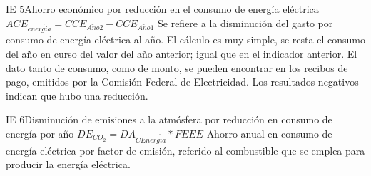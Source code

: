 \begin{indicador}{IE 5}{Ahorro económico por reducción en el consumo de energía eléctrica}
	{$ACE_{energ\acute{i}a} = CCE_{A\tilde{n}o 2} - CCE_{A\tilde{n}o 1}$}
	{
		Se refiere a la disminución del gasto por consumo de energía eléctrica al año. El cálculo es muy simple, se resta el consumo del año en curso del valor del año anterior; 
		igual que en el indicador anterior. El dato tanto de consumo, como de monto, se pueden encontrar en los recibos de pago, emitidos por la Comisión Federal de Electricidad. Los resultados negativos indican que hubo una reducción.
	} 	
\end{indicador}
\begin{indicador}{IE 6}{Disminución de emisiones a la atmósfera por reducción en consumo de energía por año} %
	{$DE_{CO_2} = DA_{CEnerg\acute{i}a} * FEEE$}
	{
		Ahorro anual en consumo de energía eléctrica por factor de emisión, referido al combustible que se emplea para producir la energía eléctrica.
	} 	
\end{indicador}